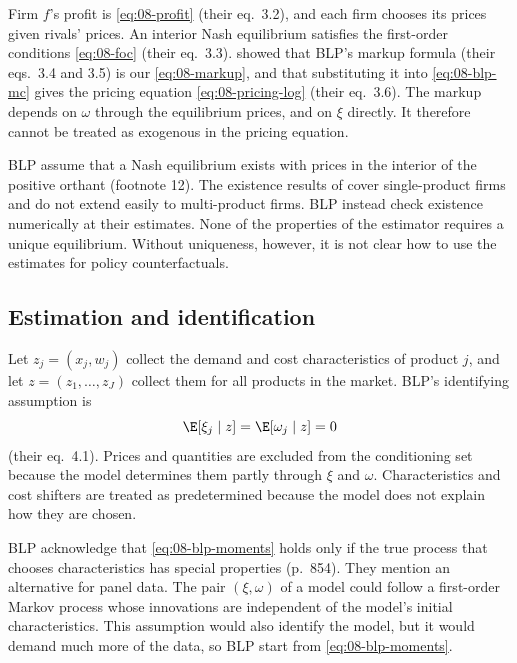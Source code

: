Firm $f$'s profit is \eqref{eq:08-profit} (their eq.~3.2), and each firm chooses its prices given rivals'
prices. An interior Nash equilibrium satisfies the first-order conditions \eqref{eq:08-foc} (their eq.~3.3).
 showed that BLP's markup formula (their eqs.~3.4 and 3.5) is our
\eqref{eq:08-markup}, and that substituting it into \eqref{eq:08-blp-mc} gives the pricing equation
\eqref{eq:08-pricing-log} (their eq.~3.6). The markup depends on $\omega$ through the equilibrium prices, and on
$\xi$ directly. It therefore cannot be treated as exogenous in the pricing equation.

BLP assume that a Nash equilibrium exists with prices in the interior of the positive orthant
(footnote 12). The existence results of \citet{CaplinNalebuff1991} cover single-product firms and do
not extend easily to multi-product firms. BLP instead check existence numerically at their estimates.
None of the properties of the estimator requires a unique equilibrium. Without uniqueness, however, it
is not clear how to use the estimates for policy counterfactuals.

\subsection{Estimation and identification}\label{sec:08-blp95-estimation}

Let $z_j=(x_j,w_j)$ collect the demand and cost characteristics of product $j$, and let
$z=(z_1,\dots,z_J)$ collect them for all products in the market. BLP's identifying assumption is
\begin{equation}\label{eq:08-blp-moments}
\E[\xi_j\mid z]=\E[\omega_j\mid z]=0
\end{equation}
(their eq.~4.1). Prices and quantities are excluded from the conditioning set because the model
determines them partly through $\xi$ and $\omega$. Characteristics and cost shifters are treated as
predetermined because the model does not explain how they are chosen.

BLP acknowledge that \eqref{eq:08-blp-moments} holds only if the true process that chooses
characteristics has special properties (p.~854). They mention an alternative for panel data. The
pair $(\xi,\omega)$ of a model could follow a first-order Markov process whose innovations are
independent of the model's initial characteristics. This assumption would also identify the model, but
it would demand much more of the data, so BLP start from \eqref{eq:08-blp-moments}.


